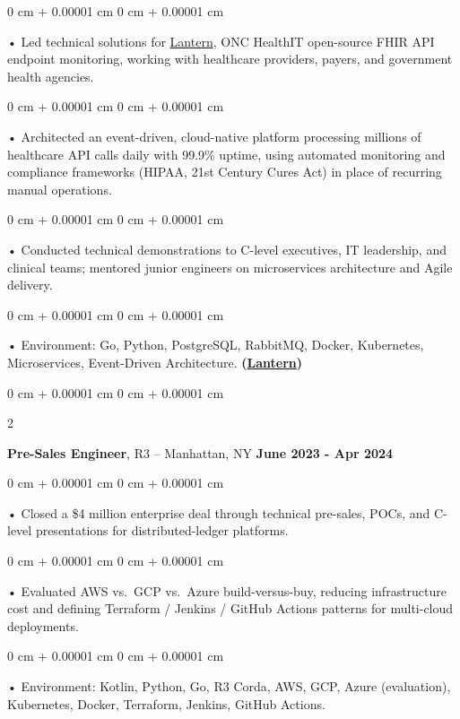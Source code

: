 \documentclass[10pt, letterpaper]{article}
\newenvironment{onecolentry}{
    \begin{adjustwidth}{
        0 cm + 0.00001 cm
    }{
        0 cm + 0.00001 cm
    }
}{
    \end{adjustwidth}
} %
\newenvironment{twocolentry}[2][]{
    \onecolentry
    \def\secondColumn{#2}
    \setcolumnwidth{\fill, 4.5 cm}
    \begin{paracol}{2}
}{
    \switchcolumn \raggedleft \secondColumn
    \end{paracol}
    \endonecolentry
} %
\begin{document}
        \begin{onecolentry}
             • Led technical solutions for \href{https://lantern.healthit.gov/?tab=dashboard_tab}{Lantern}, ONC HealthIT open-source FHIR API endpoint monitoring, working with healthcare providers, payers, and government health agencies.
        \end{onecolentry}
        \begin{onecolentry}
             • Architected an event-driven, cloud-native platform processing millions of healthcare API calls daily with 99.9\% uptime, using automated monitoring and compliance frameworks (HIPAA, 21st Century Cures Act) in place of recurring manual operations.
        \end{onecolentry}
        \begin{onecolentry}
             • Conducted technical demonstrations to C-level executives, IT leadership, and clinical teams; mentored junior engineers on microservices architecture and Agile delivery.
        \end{onecolentry}
        \begin{onecolentry}
             • Environment: Go, Python, PostgreSQL, RabbitMQ, Docker, Kubernetes, Microservices, Event-Driven Architecture. \textbf{(\href{https://lantern.healthit.gov/?tab=dashboard_tab}{Lantern})}
        \end{onecolentry}
        \vspace{0.1cm}

        \begin{twocolentry}{
            \textbf{June 2023 - Apr 2024}
        }
            \textbf{Pre-Sales Engineer}, R3 -- Manhattan, NY\end{twocolentry}


        \begin{onecolentry}
             • Closed a \$4 million enterprise deal through technical pre-sales, POCs, and C-level presentations for distributed-ledger platforms.
        \end{onecolentry}
        \begin{onecolentry}
             • Evaluated AWS vs.\ GCP vs.\ Azure build-versus-buy, reducing infrastructure cost and defining Terraform / Jenkins / GitHub Actions patterns for multi-cloud deployments.
        \end{onecolentry}
        \begin{onecolentry}
             • Environment: Kotlin, Python, Go, R3 Corda, AWS, GCP, Azure (evaluation), Kubernetes, Docker, Terraform, Jenkins, GitHub Actions.
        \end{onecolentry}
        \vspace{0.1cm}
\end{document}
